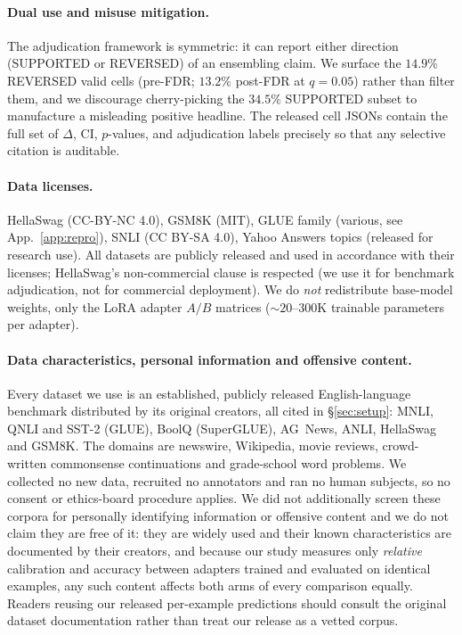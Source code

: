 \documentclass[11pt]{article}
\begin{document}
\paragraph{Dual use and misuse mitigation.} The adjudication framework is symmetric: it can report either direction (SUPPORTED or REVERSED) of an ensembling claim. We surface the $14.9\%$ REVERSED valid cells (pre-FDR; $13.2\%$ post-FDR at $q{=}0.05$) rather than filter them, and we discourage cherry-picking the $34.5\%$ SUPPORTED subset to manufacture a misleading positive headline. The released cell JSONs contain the full set of $\Delta$, CI, $p$-values, and adjudication labels precisely so that any selective citation is auditable.

\paragraph{Data licenses.} HellaSwag (CC-BY-NC 4.0), GSM8K (MIT), GLUE family (various, see App.~\ref{app:repro}), SNLI \citep{bowman2015snli} (CC BY-SA 4.0), Yahoo Answers topics \citep{zhang2015character} (released for research use). All datasets are publicly released and used in accordance with their licenses; HellaSwag's non-commercial clause is respected (we use it for benchmark adjudication, not for commercial deployment). We do \emph{not} redistribute base-model weights, only the LoRA adapter $A/B$ matrices ($\sim$$20$--$300$K trainable parameters per adapter).

\paragraph{Data characteristics, personal information and offensive content.} Every dataset we use is an established, publicly released English-language benchmark distributed by its original creators, all cited in \S\ref{sec:setup}: MNLI, QNLI and SST-2 (GLUE), BoolQ (SuperGLUE), AG~News, ANLI, HellaSwag and GSM8K. The domains are newswire, Wikipedia, movie reviews, crowd-written commonsense continuations and grade-school word problems. We collected no new data, recruited no annotators and ran no human subjects, so no consent or ethics-board procedure applies. We did not additionally screen these corpora for personally identifying information or offensive content and we do not claim they are free of it: they are widely used and their known characteristics are documented by their creators, and because our study measures only \emph{relative} calibration and accuracy between adapters trained and evaluated on identical examples, any such content affects both arms of every comparison equally. Readers reusing our released per-example predictions should consult the original dataset documentation rather than treat our release as a vetted corpus.
\end{document}
